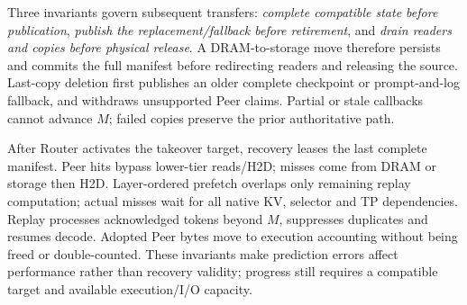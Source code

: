 Three invariants govern subsequent transfers:
\emph{complete compatible state before publication},
\emph{publish the replacement/fallback before retirement}, and
\emph{drain readers and copies before physical release}.
A DRAM-to-storage move therefore persists and commits the full manifest
before redirecting readers and releasing the source. Last-copy deletion
first publishes an older complete checkpoint or prompt-and-log fallback,
and withdraws unsupported Peer claims. Partial or stale callbacks cannot
advance $M$; failed copies preserve the prior authoritative path.

After Router activates the takeover target, recovery leases the last
complete manifest. Peer hits bypass lower-tier reads/H2D; misses come
from DRAM or storage then H2D. Layer-ordered prefetch overlaps only
remaining replay computation; actual misses wait for all native KV,
selector and TP dependencies. Replay processes acknowledged tokens beyond
$M$, suppresses duplicates and resumes decode. Adopted Peer bytes move
to execution accounting without being freed or double-counted.
These invariants make prediction errors affect performance rather than
recovery validity; progress still requires a compatible target and
available execution/I/O capacity.
